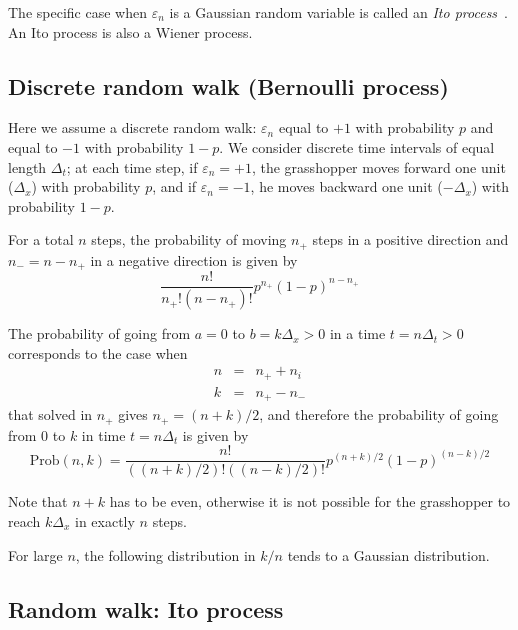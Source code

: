 \documentclass[justified, sixbynine]{tufte-book}
\theoremstyle{plain}%
\newtheorem * {corollary}{Corollary}
\theoremstyle{definition}
\theoremstyle{remark}
\newtheorem * {remark}{Remark}
\newtheorem * {note}{Note}
\begin{document}
\begin{fullwidth}
The specific case when $\varepsilon _n$ is a Gaussian random variable is called an {\it Ito process}~\cite{ito}. An Ito process is also a Wiener process.

\goodbreak\subsection{Discrete random walk (Bernoulli process)}

Here we assume a discrete  random walk: $\varepsilon _n$ equal to
$+1$ with probability $p$ and equal to $-1$ with probability $1-p.$ We
consider discrete time intervals of equal length $\Delta _t$; at each time
step, if $\varepsilon _n=+1$, the grasshopper moves forward one unit ($\Delta _x$)
with probability $p$, and if $\varepsilon _n=-1$, he moves backward one
unit ($-\Delta _x$) with probability $1-p$.

For a total $n$ steps, the probability of moving $n_{+}$ steps in a positive
direction and $n_{-}=n-n_{+}$ in a negative direction is given by
\begin{equation}
\frac{n!}{n_{+}!(n-n_{+})!}p^{n_{+}}(1-p)^{n-n_{+}}
\end{equation}

The probability of going from $a=0$ to $b=k\Delta _x>0$ in a time $t=n\Delta
_t>0$ corresponds to the case when
\begin{eqnarray}
n &=&n_{+}+n_i \\
k &=&n_{+}-n_{-}
\end{eqnarray}
that solved in $n_{+}$ gives $n_{+}=(n+k)/2$, and therefore the probability
of going from $0$ to $k$ in time $t=n\Delta _t$ is given by
\begin{equation}
\textrm{Prob}(n, k)=\frac{n!}{((n+k)/2)!((n-k)/2)!}p^{(n+k)/2}(1-p)^{(n-k)/2}
\end{equation}

Note that $n+k$ has to be even, otherwise it is not possible for the
grasshopper to reach $k\Delta _x$ in exactly $n$ steps.

For large $n$, the following distribution in $k/n$ tends to a Gaussian distribution.

\goodbreak\subsection{Random walk: Ito process}


\end{fullwidth}
\end{document}
